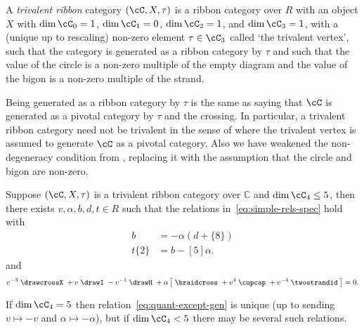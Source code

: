 \documentclass[12pt]{amsart}
\begin{document}

\begin{definition}
A \emph{trivalent ribbon} category $(\cC, X, \tau)$ is a ribbon category over
$R$ with  an object $X$ with $\dim \cC_0 = 1$, $\dim \cC_1 = 0$, $\dim{\cC_2}
= 1$, and $\dim{\cC_3} = 1$, with a (unique up to rescaling) non-zero element
$\tau \in \cC_3$ called `the trivalent vertex', such that the category is
generated as a ribbon category by $\tau$ and such that the value of the circle
is a non-zero multiple of the empty diagram and the value of the bigon is a
non-zero multiple of the strand.
\end{definition}

Being generated as a ribbon category by $\tau$ is the same as saying that
$\cC$ is generated as a pivotal category by $\tau$ and the crossing.  In
particular, a trivalent ribbon category need not be trivalent in the sense of
\cite{MR3624901} where the trivalent vertex is assumed to generate $\cC$ 
as a pivotal category.  Also we have weakened the non-degeneracy condition from
\cite{MR3624901}, replacing it with the assumption that the circle and bigon
are non-zero.

\begin{theorem} \label{thm:Jacobi}
Suppose $(\cC, X, \tau)$ is a trivalent ribbon category over
$\mathbb{C}$ and $\dim{\cC_4} \leq 5$, then there exists $v, \alpha,
b, d, t \in R$ such that the relations in~\eqref{eq:simple-rels-spec}
hold with
\begin{align*}
  [5] b &= - \alpha (d+\{8\}) \\
  t \{2\} &= b-[5] \alpha.
\end{align*}
and
\begin{equation}
v^{-3} \;
\drawcrossX
\;+ v \;
\drawI
\; -v^{-1} \;
 \drawH
\;
 + \alpha
\left[\; \braidcross \;
 + v^{4}\;
\cupcap
\; + v^{-4} \;
 \twostrandid \;
 \right] = 0.\label{eq:quant-except-gen}
\end{equation}
\end{theorem}

If $\dim{\cC_4} = 5$ then relation~\eqref{eq:quant-except-gen} is
unique (up to sending $v \mapsto -v$ and $\alpha \mapsto -\alpha$),
but if $\dim{\cC_4} < 5$ there may be several such relations.
\end{document}
